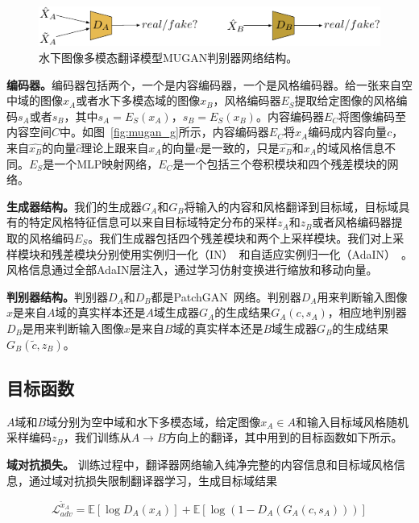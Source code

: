 \begin{figure}[ht]
    \centering
    \includegraphics[width=1\textwidth]{figures/D.pdf}
    \caption{水下图像多模态翻译模型MUGAN判别器网络结构。}
    \label{fig:mugan_d}
\end{figure}

\textbf{编码器。}编码器包括两个，一个是内容编码器，一个是风格编码器。给一张来自空中域的图像$x_A$或者水下多模态域的图像$x_B$，风格编码器$E_S$提取给定图像的风格编码$s_A$或者$s_B$，其中$s_A = E_S(x_A)$，$s_B = E_S(x_B)$。内容编码器$E_C$将图像编码至内容空间$C$中。如图~\ref{fig:mugan_g}所示，内容编码器$E_C$将$x_A$编码成内容向量$c$，来自$\hat{x_B}$的向量$\hat{c}$理论上跟来自$x_A$的向量$c$是一致的，只是$\hat{x_B}$和$x_A$的域风格信息不同。$E_S$是一个MLP映射网络，$E_C$是一个包括三个卷积模块和四个残差模块的网络。

\textbf{生成器结构。}我们的生成器$G_A$和$G_B$将输入的内容和风格翻译到目标域，目标域具有的特定风格特征信息可以来自目标域特定分布的采样$z_A$和$z_B$或者风格编码器提取的风格编码$E_S$。我们生成器包括四个残差模块和两个上采样模块。我们对上采样模块和残差模块分别使用实例归一化（IN）~\cite{ulyanov2016instance}和自适应实例归一化（AdaIN）~\cite{huang2017arbitrary}。风格信息通过全部AdaIN层注入，通过学习仿射变换进行缩放和移动向量。

\textbf{判别器结构。}判别器$D_A$和$D_B$都是PatchGAN~\cite{isola2017image}网络。判别器$D_A$用来判断输入图像$x$是来自$A$域的真实样本还是$A$域生成器$G_A$的生成结果$G_A(c,s_A)$，相应地判别器$D_B$是用来判断输入图像$x$是来自$B$域的真实样本还是$B$域生成器$G_B$的生成结果$G_B(\tilde{c},z_B)$。

\subsection{目标函数}
$A$域和$B$域分别为空中域和水下多模态域，给定图像$x_A \in A$和输入目标域风格随机采样编码$z_B$，我们训练从$A \rightarrow B$方向上的翻译，其中用到的目标函数如下所示。

\textbf{域对抗损失。} 训练过程中，翻译器网络输入纯净完整的内容信息和目标域风格信息，通过域对抗损失限制翻译器学习，生成目标域结果

\begin{equation}
\label{equ:adv_a_}
\mathcal{L}_{adv}^{\tilde{x}_A} = \mathbb{E}[\log D_A(x_A)] + \mathbb{E}[\log(1-D_A(G_A(c,s_A)))]
\end{equation}

